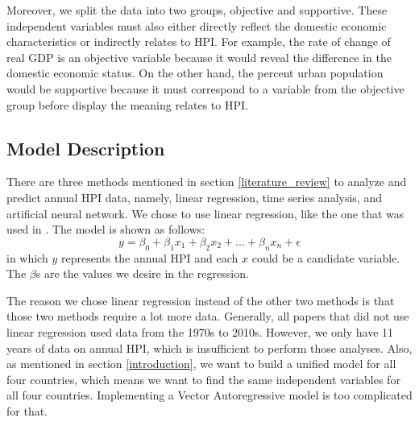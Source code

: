 \documentclass[11pt]{article}
\begin{document}
Moreover, we split the data into two groups, objective and supportive. These independent variables must also either directly reflect the domestic economic characteristics or indirectly relates to HPI. For example, the rate of change of real GDP is an objective variable because it would reveal the difference in the domestic economic status. On the other hand, the percent urban population would be supportive because it must correspond to a variable from the objective group before display the meaning relates to HPI. 


\subsection{Model Description}\label{model_description}
There are three methods mentioned in section \ref{literature_review} to analyze and predict annual HPI data, namely, linear regression, time series analysis, and artificial neural network. We chose to use linear regression, like the one that was used in \citet{GASPARENIENE2016122}. The model is shown as follows:
$$y = \beta_0 + \beta_1x_1 + \beta_2x_2 + ... + \beta_nx_n + \epsilon$$
in which $y$ represents the annual HPI and each $x$ could be a candidate variable. The $\beta$s are the values we desire in the regression.

The reason we chose linear regression instead of the other two methods is that those two methods require a lot more data. Generally, all papers that did not use linear regression used data from the 1970s to 2010s. However, we only have 11 years of data on annual HPI, which is insufficient to perform those analyses. Also, as mentioned in section \ref{introduction}, we want to build a unified model for all four countries, which means we want to find the same independent variables for all four countries. Implementing a Vector Autoregressive model is too complicated for that.
\end{document}
